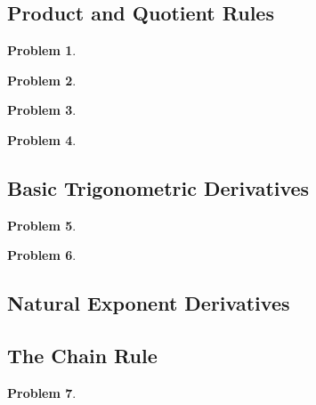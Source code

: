 \documentclass{article}
\newtheorem{problem}{Problem}
\begin{document}
\subsection{Product and Quotient Rules}\label{secMPSproductQuotientRules}

\begin{problem}

\end{problem}


\begin{problem}

\end{problem}


\begin{problem}

\end{problem}


\begin{problem}

\end{problem}

\subsection{Basic Trigonometric Derivatives}\label{secMPStrigDerivatives}
\begin{problem}

\end{problem}
\begin{problem}

\end{problem}
\subsection{Natural Exponent Derivatives}


\subsection{The Chain Rule}\label{secMPSchainRule}

\begin{problem}

\end{problem}

\end{document}
